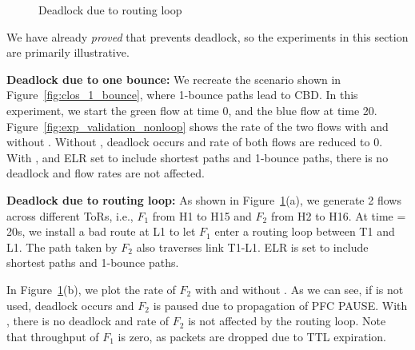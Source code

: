 \begin{figure}[t]
	\centering
	
	
	\caption{Deadlock due to routing loop}\label{fig:exp_validation_loop}
	
\end{figure}

We have already {\em proved} that \sysname{} prevents deadlock, so the
experiments in this section are primarily illustrative. 

\textbf{Deadlock due to one bounce:} We recreate the scenario shown in
Figure~\ref{fig:clos_1_bounce}, where 1-bounce paths lead to CBD.  In this
experiment, we start the green flow at time 0, and the blue flow at time 20.
Figure~\ref{fig:exp_validation_nonloop} shows the rate of the two flows with and
without \sysname{}.  Without \sysname{}, deadlock occurs and rate of both flows
are reduced to 0. With \sysname{}, and ELR set to include shortest paths and
1-bounce paths, there is no deadlock and flow rates are not affected.

\textbf{Deadlock due to routing loop:} As shown in
Figure~\ref{fig:exp_validation_loop}(a), we generate 2 flows across different
ToRs, i.e.,  $F_1$ from H1 to H15 and $F_2$ from H2 to H16. At time = 20s, we
install a bad route at L1 to let $F_1$ enter a routing loop between T1 and L1.
The path taken by $F_2$ also traverses link T1-L1.  ELR is set to include
shortest paths and 1-bounce paths.

In Figure~\ref{fig:exp_validation_loop}(b), we plot the rate of $F_2$ with and
without \sysname{}. As we can see, if \sysname{} is not used, deadlock occurs
and $F_2$ is paused due to propagation of PFC PAUSE. With \sysname{}, there is
no deadlock and rate of $F_2$ is not affected by the routing loop. Note that
throughput of $F_1$ is zero, as packets are dropped due to TTL expiration.

